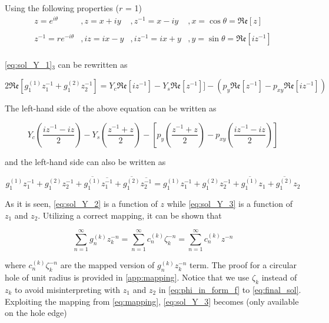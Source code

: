 \documentclass{article}
\begin{document}
Using the following properties ($r$ = 1)
\begin{equation}
    \begin{matrix}
    z = e^{i\theta} & , 
    z = x + i y & , 
    z^{-1} = x - iy & , 
    x = \cos\theta = \mathfrak{Re}[z] \\
    \\
    z^{-1} = r e^{-i\theta} & , 
    iz = ix - y & , 
    iz^{-1} = ix + y & , 
    y = \sin\theta = \mathfrak{Re}[iz^{-1}] \\
    \end{matrix}
    \label{z_properties}
\end{equation}

\cref{eq:sol_Y_1}$_3$ can be rewritten as

\begin{equation*}
    2 \mathfrak{Re}[g_1^{(1)} z_1^{-1} + g_1^{(2)} z_2^{-1}] = Y_c \mathfrak{Re}[iz^{-1}] - Y_s \mathfrak{Re}[z^{-1}]] - (p_y \mathfrak{Re}[z^{-1}] - p_{xy} \mathfrak{Re}[iz^{-1}])
\end{equation*}

The left-hand side of the above equation can be written as

\begin{equation}
    Y_c \left(\dfrac{iz^{-1} - iz}{2}\right) - Y_s \left(\dfrac{z^{-1} + z}{2}\right) - \left[ p_y \left(\dfrac{z^{-1} + z}{2}\right) - p_{xy} \left(\dfrac{iz^{-1} - iz}{2}\right) \right]
    \label{eq:sol_Y_2}
\end{equation}

and the left-hand side can also be written as

\begin{equation}
    g_1^{(1)} z_1^{-1} + g_1^{(2)} z_2^{-1} + \overline{g_1^{(1)}} \overline{z_1^{-1}} + \overline{g_1^{(2)}} \overline{z_2^{-1}} = g_1^{(1)} z_1^{-1} + g_1^{(2)} z_2^{-1} + \overline{g_1^{(1)}} z_1 + \overline{g_1^{(2)}} z_2
    \label{eq:sol_Y_3}
\end{equation}

As it is seen, \cref{eq:sol_Y_2} is a function of $z$ while \cref{eq:sol_Y_3} is a function of $z_1$ and $z_2$. Utilizing a correct mapping, it can be shown that

\begin{equation}
    \sum_{n=1}^{\infty}{g_n^{(k)} z_k^{-n}} = \sum_{n=1}^{\infty}{c_n^{(k)} \zeta_k^{-n}} = \sum_{n=1}^{\infty}{c_n^{(k)} z^{-n}}
    \label{eq:mapping}
\end{equation}

where $c_n^{(k)} \zeta_k^{-n}$ are the mapped version of $g_n^{(k)} z_k^{-n}$ term. The proof for a circular hole of unit radius is provided in \cref{app:mapping}. Notice that we use $\zeta_k$ instead of $z_k$ to avoid misinterpreting with $z_1$ and $z_2$ in \cref{eq:phi_in_form_f} to \cref{eq:final_sol}. Exploiting the mapping from \cref{eq:mapping}, \cref{eq:sol_Y_3} becomes (only available on the hole edge)
\end{document}
